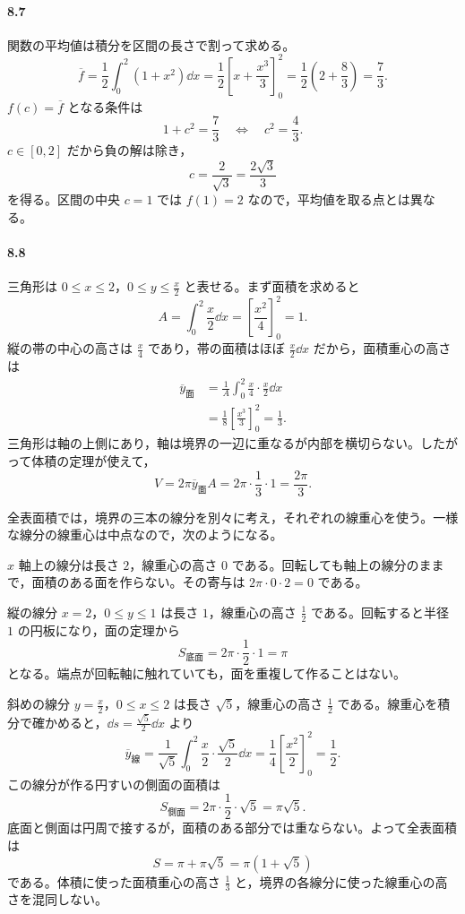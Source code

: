 \paragraph{8.7}
関数の平均値は積分を区間の長さで割って求める。
\[
\overline f=\frac12\int_0^2(1+x^2)\dd x
 =\frac12\left[x+\frac{x^3}{3}\right]_0^2
 =\frac12\left(2+\frac83\right)=\frac73.
\]
$f(c)=\overline f$ となる条件は
\[
1+c^2=\frac73
\quad\Longleftrightarrow\quad
c^2=\frac43.
\]
$c\in[0,2]$ だから負の解は除き，
\[
c=\frac{2}{\sqrt3}=\frac{2\sqrt3}{3}
\]
を得る。区間の中央 $c=1$ では $f(1)=2$ なので，平均値を取る点とは異なる。

\paragraph{8.8}
三角形は $0\leq x\leq2$，$0\leq y\leq\frac{x}{2}$ と表せる。まず面積を求めると
\[
A=\int_0^2\frac{x}{2}\dd x
 =\left[\frac{x^2}{4}\right]_0^2=1.
\]
縦の帯の中心の高さは $\frac{x}{4}$ であり，帯の面積はほぼ $\frac{x}{2}\dd x$ だから，面積重心の高さは
\[
\begin{aligned}
\overline y_{\mathrm{面}}
 &=\frac1A\int_0^2\frac{x}{4}\cdot\frac{x}{2}\dd x\\
 &=\frac18\left[\frac{x^3}{3}\right]_0^2
 =\frac13.
\end{aligned}
\]
三角形は軸の上側にあり，軸は境界の一辺に重なるが内部を横切らない。したがって体積の定理が使えて，
\[
V=2\pi\overline y_{\mathrm{面}}A
 =2\pi\cdot\frac13\cdot1=\frac{2\pi}{3}.
\]

全表面積では，境界の三本の線分を別々に考え，それぞれの線重心を使う。一様な線分の線重心は中点なので，次のようになる。

$x$ 軸上の線分は長さ $2$，線重心の高さ $0$ である。回転しても軸上の線分のままで，面積のある面を作らない。その寄与は $2\pi\cdot0\cdot2=0$ である。

縦の線分 $x=2$，$0\leq y\leq1$ は長さ $1$，線重心の高さ $\frac12$ である。回転すると半径 $1$ の円板になり，面の定理から
\[
S_{\mathrm{底面}}=2\pi\cdot\frac12\cdot1=\pi
\]
となる。端点が回転軸に触れていても，面を重複して作ることはない。

斜めの線分 $y=\frac{x}{2}$，$0\leq x\leq2$ は長さ $\sqrt5$，線重心の高さ $\frac12$ である。線重心を積分で確かめると，$\dd s=\frac{\sqrt5}{2}\dd x$ より
\[
\overline y_{\mathrm{線}}
 =\frac1{\sqrt5}\int_0^2\frac{x}{2}\cdot\frac{\sqrt5}{2}\dd x
 =\frac14\left[\frac{x^2}{2}\right]_0^2=\frac12.
\]
この線分が作る円すいの側面の面積は
\[
S_{\mathrm{側面}}=2\pi\cdot\frac12\cdot\sqrt5=\pi\sqrt5.
\]
底面と側面は円周で接するが，面積のある部分では重ならない。よって全表面積は
\[
S=\pi+\pi\sqrt5=\pi(1+\sqrt5)
\]
である。体積に使った面積重心の高さ $\frac13$ と，境界の各線分に使った線重心の高さを混同しない。
